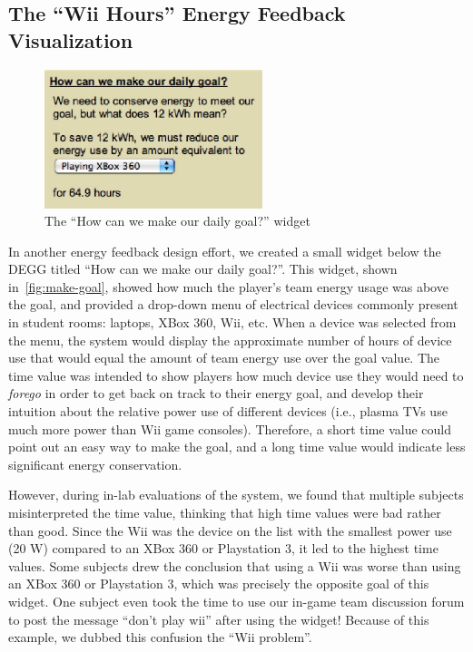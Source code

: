 \documentclass[10pt, conference, compsocconf]{IEEEtran}
\begin{document}
\subsection{The ``Wii Hours'' Energy Feedback Visualization}

\begin{figure}[!tb]
	\centering
	\includegraphics[width=2.5in]{how-meet-goal.eps}
	\caption{The ``How can we make our daily goal?'' widget}
	\label{fig:make-goal}
\end{figure}

In another energy feedback design effort, we created a small widget below the DEGG titled ``How can we make our daily goal?''. This widget, shown in~\autoref{fig:make-goal}, showed how much the player's team energy usage was above the goal, and provided a drop-down menu of electrical devices commonly present in student rooms: laptops, XBox 360, Wii, etc. When a device was selected from the menu, the system would display the approximate number of hours of device use that would equal the amount of team energy use over the goal value. The time value was intended to show players how much device use they would need to \emph{forego} in order to get back on track to their energy goal, and develop their intuition about the relative power use of different devices (i.e., plasma TVs use much more power than Wii game consoles). Therefore, a short time value could point out an easy way to make the goal, and a long time value would indicate less significant energy conservation.

However, during in-lab evaluations of the system, we found that multiple subjects misinterpreted the time value, thinking that high time values were bad rather than good. Since the Wii was the device on the list with the smallest power use (20 W) compared to an XBox 360 or Playstation 3, it led to the highest time values. Some subjects drew the conclusion that using a Wii was worse than using an XBox 360 or Playstation 3, which was precisely the opposite goal of this widget. One subject even took the time to use our in-game team discussion forum to post the message ``don't play wii'' after using the widget! Because of this example, we dubbed this confusion the ``Wii problem''.
\end{document}
